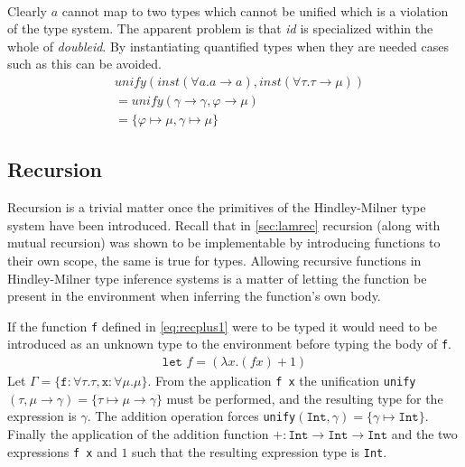 \begin{exmp}
\begin{align}
\end{align}
    Clearly $a$ cannot map to two types which cannot be unified which is a violation of the type system.
    The apparent problem is that \textit{id} is specialized within the whole of \textit{doubleid}.
    By instantiating quantified types when they are needed cases such as this can be avoided.
    \begin{align}
        &\textit{unify}(\textit{inst}(\forall a . a \rightarrow a), \textit{inst}(\forall \tau . \tau \rightarrow \mu))\\
        & = \textit{unify}(\gamma \rightarrow \gamma, \varphi \rightarrow \mu) \tag*{}\\
        & = \{ \varphi \mapsto \mu, \gamma \mapsto \mu \} \tag*{}
    \end{align}
\end{exmp}
\subsection{Recursion}
Recursion is a trivial matter once the primitives of the Hindley-Milner type system have been introduced.
Recall that in \autoref{sec:lamrec} recursion (along with mutual recursion) was shown to be implementable by introducing functions to their own scope, the same is true for types.
Allowing recursive functions in Hindley-Milner type inference systems is a matter of letting the function be present in the environment when inferring the function's own body.
\begin{exmp}
If the function \texttt{f} defined in \autoref{eq:recplus1} were to be typed it would need to be introduced as an unknown type to the environment before typing the body of \texttt{f}.
\begin{align}
  \texttt{let } f = (\lambda x. (f x) + 1) \label{eq:recplus1}
\end{align}
Let $\Gamma = \{ \texttt{f} : \forall \tau . \tau, \texttt{x} : \forall \mu . \mu \}$.
From the application \texttt{f x} the unification \texttt{unify}$(\tau, \mu \rightarrow \gamma) = \{ \tau \mapsto \mu \rightarrow \gamma \}$ must be performed, and the resulting type for the expression is $\gamma$.
The addition operation forces \texttt{unify}$(\texttt{Int}, \gamma) = \{ \gamma \mapsto \texttt{Int} \}$.
Finally the application of the addition function $+: \texttt{Int} \rightarrow \texttt{Int} \rightarrow \texttt{Int}$ and the two expressions \texttt{f x} and $1$ such that the resulting expression type is \texttt{Int}.

\end{exmp}

